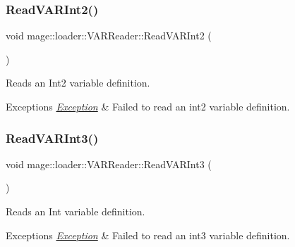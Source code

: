 \subsubsection{\texorpdfstring{Read\+V\+A\+R\+Int2()}{ReadVARInt2()}}
{\footnotesize\ttfamily void mage\+::loader\+::\+V\+A\+R\+Reader\+::\+Read\+V\+A\+R\+Int2 (\begin{DoxyParamCaption}{ }\end{DoxyParamCaption})\hspace{0.3cm}{\ttfamily [private]}}

Reads an Int2 variable definition.


\begin{DoxyExceptions}{Exceptions}
{\em \hyperlink{classmage_1_1_exception}{Exception}} & Failed to read an int2 variable definition. \\
\hline
\end{DoxyExceptions}
\hypertarget{classmage_1_1loader_1_1_v_a_r_reader_a519dd541a8ee90bc83505d80e5dc1f49}{}\label{classmage_1_1loader_1_1_v_a_r_reader_a519dd541a8ee90bc83505d80e5dc1f49} 
\subsubsection{\texorpdfstring{Read\+V\+A\+R\+Int3()}{ReadVARInt3()}}
{\footnotesize\ttfamily void mage\+::loader\+::\+V\+A\+R\+Reader\+::\+Read\+V\+A\+R\+Int3 (\begin{DoxyParamCaption}{ }\end{DoxyParamCaption})\hspace{0.3cm}{\ttfamily [private]}}

Reads an Int variable definition.


\begin{DoxyExceptions}{Exceptions}
{\em \hyperlink{classmage_1_1_exception}{Exception}} & Failed to read an int3 variable definition. \\
\hline
\end{DoxyExceptions}
\hypertarget{classmage_1_1loader_1_1_v_a_r_reader_a4ccc6a48ca72707853ff910362318940}{}\label{classmage_1_1loader_1_1_v_a_r_reader_a4ccc6a48ca72707853ff910362318940} 
